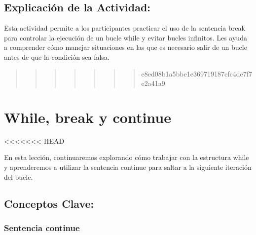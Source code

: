 \documentclass[
  a4paper,
  DIV=11,
  numbers=noendperiod,
  onepage,
  openany]{scrreprt}
\begin{document}
\hypertarget{explicaciuxf3n-de-la-actividad-37}{%
\section{Explicación de la
Actividad:}\label{explicaciuxf3n-de-la-actividad-37}}

Esta actividad permite a los participantes practicar el uso de la
sentencia break para controlar la ejecución de un bucle while y evitar
bucles infinitos. Les ayuda a comprender cómo manejar situaciones en las
que es necesario salir de un bucle antes de que la condición sea falsa.

\begin{quote}
\begin{quote}
\begin{quote}
\begin{quote}
\begin{quote}
\begin{quote}
\begin{quote}
e8ed08b1a5bbe1e369719187cfc4de7f7e2a41a9
\end{quote}
\end{quote}
\end{quote}
\end{quote}
\end{quote}
\end{quote}
\end{quote}

\hypertarget{while-break-y-continue}{%
\chapter{While, break y continue}\label{while-break-y-continue}}

\textless\textless\textless\textless\textless\textless\textless{} HEAD

En esta lección, continuaremos explorando cómo trabajar con la
estructura while y aprenderemos a utilizar la sentencia continue para
saltar a la siguiente iteración del bucle.

\hypertarget{conceptos-clave-40}{%
\section{Conceptos Clave:}\label{conceptos-clave-40}}

\hypertarget{sentencia-continue}{%
\subsection{Sentencia continue}\label{sentencia-continue}}
\end{document}
